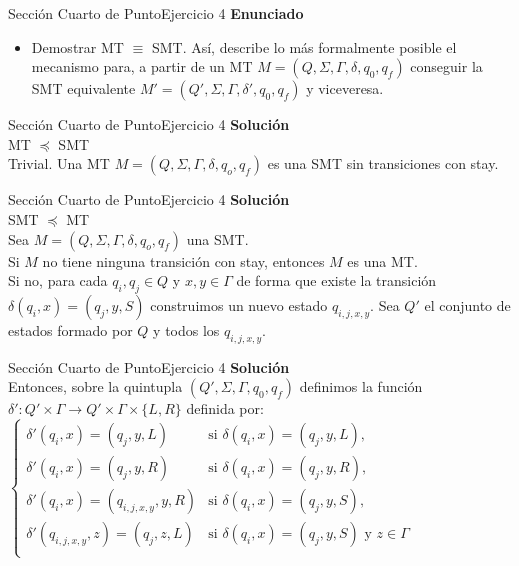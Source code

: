 \documentclass[10pt, envcountsect, presentation, aspectratio=169]{beamer}
\begin{document}

\begin{frame}{Sección Cuarto de Punto}{Ejercicio 4}
\textbf{Enunciado}
	\begin{itemize}
        \item Demostrar MT $\equiv$ SMT. Así, describe lo más formalmente posible el mecanismo para, a partir de un MT $M=(Q,\Sigma,\Gamma,\delta,q_0,q_f)$ conseguir la SMT equivalente $M'=(Q',\Sigma,\Gamma,\delta',q_0,q_f)$ y viceveresa.
	\end{itemize}
\end{frame}


\begin{frame}{Sección Cuarto de Punto}{Ejercicio 4}
    \textbf{Solución}\\
    MT $\preceq$ SMT\\
    Trivial. Una MT $M=(Q,\Sigma,\Gamma,\delta,q_o,q_f)$ es una SMT sin transiciones con stay.
\end{frame}


\begin{frame}{Sección Cuarto de Punto}{Ejercicio 4}
    \textbf{Solución}\\
    SMT $\preceq$ MT\\
    Sea $M=(Q,\Sigma,\Gamma,\delta,q_o,q_f)$ una SMT.\\ 
    Si $M$ no tiene ninguna transición con stay, entonces $M$ es una MT.\\
    Si no, para cada $q_i,q_j \in Q$ y $x,y \in \Gamma$ de forma que existe la transición $\delta(q_i,x)=(q_j,y,S)$ construimos un nuevo estado $q_{i,j,x,y}$.
    Sea $Q'$ el conjunto de estados formado por $Q$ y todos los $q_{i,j,x,y}$.
\end{frame}


\begin{frame}{Sección Cuarto de Punto}{Ejercicio 4}
    \textbf{Solución}\\
    Entonces, sobre la quintupla $(Q',\Sigma,\Gamma,q_0,q_f)$ definimos la función $\delta':Q' \times \Gamma \rightarrow Q' \times \Gamma \times \{L,R\}$ definida por:\\
    $\begin{cases}
        \delta'(q_i,x) = (q_j,y,L) & \text{si } \delta(q_i,x) = (q_j,y,L),\\
        \delta'(q_i,x) = (q_j,y,R) & \text{si } \delta(q_i,x) = (q_j,y,R),\\
        \delta'(q_i,x) = (q_{i,j,x,y},y,R) & \text{si } \delta(q_i,x) = (q_j,y,S),\\
        \delta'(q_{i,j,x,y},z) = (q_j,z,L) & \text{si } \delta(q_i,x) = (q_j,y,S) \text{ y } z \in \Gamma\\
    \end{cases}$
\end{frame}
\end{document}
